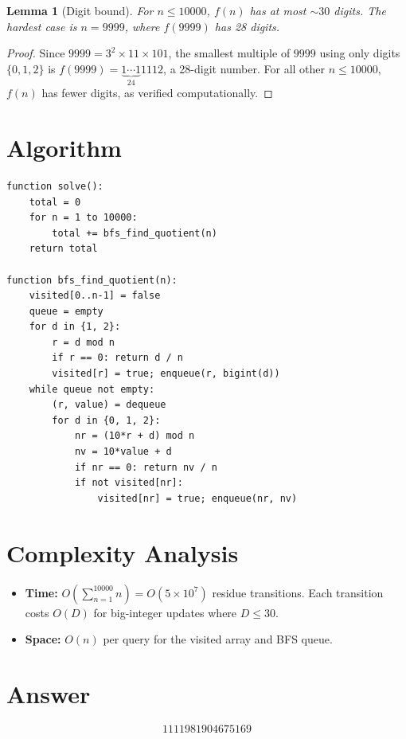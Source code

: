 \documentclass[12pt]{article}
\newtheorem{lemma}[theorem]{Lemma}
\begin{document}
\begin{lemma}[Digit bound]\label{lem:digits}
For $n \le 10000$, $f(n)$ has at most $\sim 30$ digits. The hardest case is $n = 9999$, where $f(9999)$ has 28 digits.
\end{lemma}

\begin{proof}
Since $9999 = 3^2 \times 11 \times 101$, the smallest multiple of $9999$ using only digits $\{0,1,2\}$ is $f(9999) = \underbrace{1\cdots1}_{24}1112$, a 28-digit number. For all other $n \le 10000$, $f(n)$ has fewer digits, as verified computationally.
\end{proof}

\section{Algorithm}
\begin{verbatim}
function solve():
    total = 0
    for n = 1 to 10000:
        total += bfs_find_quotient(n)
    return total

function bfs_find_quotient(n):
    visited[0..n-1] = false
    queue = empty
    for d in {1, 2}:
        r = d mod n
        if r == 0: return d / n
        visited[r] = true; enqueue(r, bigint(d))
    while queue not empty:
        (r, value) = dequeue
        for d in {0, 1, 2}:
            nr = (10*r + d) mod n
            nv = 10*value + d
            if nr == 0: return nv / n
            if not visited[nr]:
                visited[nr] = true; enqueue(nr, nv)
\end{verbatim}

\section{Complexity Analysis}
\begin{itemize}
    \item \textbf{Time:} $O\!\left(\sum_{n=1}^{10000} n\right) = O(5 \times 10^7)$ residue transitions. Each transition costs $O(D)$ for big-integer updates where $D \le 30$.
    \item \textbf{Space:} $O(n)$ per query for the visited array and BFS queue.
\end{itemize}

\section{Answer}

\[
\boxed{1111981904675169}
\]
\end{document}
